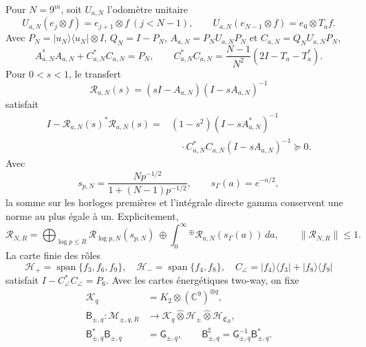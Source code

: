 Pour \(N=9^m\), soit \(U_{a,N}\) l'odomètre unitaire
\[
 U_{a,N}(e_j\otimes f)=e_{j+1}\otimes f\ (j<N-1),
 \qquad U_{a,N}(e_{N-1}\otimes f)=e_0\otimes T_af.
\]
Avec \(P_N=|u_N\rangle\langle u_N|\otimes I\), \(Q_N=I-P_N\),
\(A_{a,N}=P_NU_{a,N}P_N\) et \(C_{a,N}=Q_NU_{a,N}P_N\),
\begin{equation}\label{eq:pdf2-rh-source-energia}
 A_{a,N}^*A_{a,N}+C_{a,N}^*C_{a,N}=P_N,
 \qquad
 C_{a,N}^*C_{a,N}
 =\frac{N-1}{N^2}(2I-T_a-T_a^*).
\end{equation}
Pour \(0<s<1\), le transfert
\begin{equation}\label{eq:pdf2-rh-source-redheffer}
 \mathscr R_{a,N}(s)=(sI-A_{a,N})(I-sA_{a,N})^{-1}
\end{equation}
satisfait
\begin{equation}\label{eq:pdf2-rh-source-defecto}
\begin{aligned}
 I-\mathscr R_{a,N}(s)^*\mathscr R_{a,N}(s)
 ={}&(1-s^2)(I-sA_{a,N}^*)^{-1}\\
 &\quad\cdot C_{a,N}^*C_{a,N}(I-sA_{a,N})^{-1}\succeq0.
\end{aligned}
\end{equation}
Avec
\[
 s_{p,N}=\frac{Np^{-1/2}}{1+(N-1)p^{-1/2}},
 \qquad s_\Gamma(a)=e^{-a/2},
\]
la somme sur les horloges premières et l'intégrale directe gamma conservent une norme au
plus égale à un. Explicitement,
\begin{equation}\label{eq:pdf2-rh-source-relojes}
 \mathscr R_{N,R}
 =\bigoplus_{\log p\leq R}
   \mathscr R_{\log p,N}(s_{p,N})
 \ \oplus\!
 \int_0^\infty{}^\oplus
   \mathscr R_{a,N}(s_\Gamma(a))\,da,
 \qquad \|\mathscr R_{N,R}\|\leq1.
\end{equation}
La carte finie des rôles
\[
 \mathcal H_+=\operatorname{span}\{f_3,f_6,f_9\},\quad
 \mathcal H_-=\operatorname{span}\{f_4,f_8\},\quad
 C_\angle=|f_4\rangle\langle f_3|+|f_8\rangle\langle f_9|
\]
satisfait \(I-C_\angle^*C_\angle=P_6\). Avec les cartes énergétiques
two-way, on fixe
\begin{equation}\label{eq:pdf2-rh-source-cartas}
\begin{aligned}
 \mathcal K_q&=K_2\otimes(\mathbb C^9)^{\otimes q},\\
 \mathsf B_{\pm,q}:\mathcal M_{\pm,q,R}
 &\longrightarrow
 \mathcal K_q\widehat\otimes\mathcal H_\pm
 \widehat\otimes\mathcal H_{\mathfrak C_R},\\
 \mathsf B_{\pm,q}^*\mathsf B_{\pm,q}&=\mathsf G_{\pm,q},
 \qquad
 \mathsf B_{\pm,q}^{\sharp}
 =\mathsf G_{\pm,q}^{-1}\mathsf B_{\pm,q}^*.
\end{aligned}
\end{equation}
